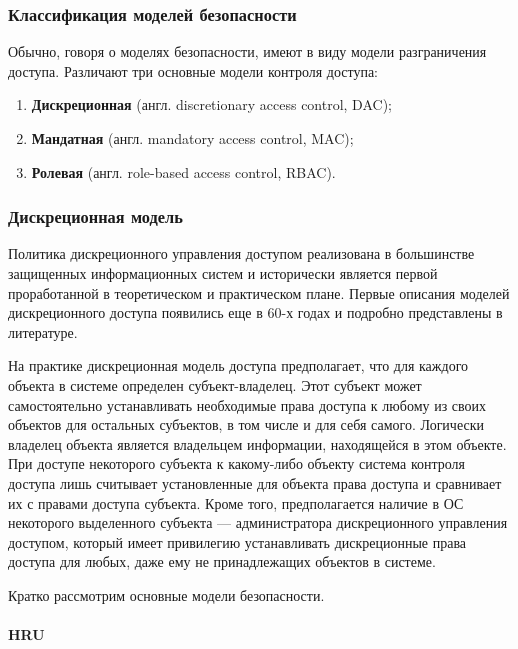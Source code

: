 \subsubsection{Классификация моделей безопасности}

Обычно, говоря о моделях безопасности, имеют в виду модели разграничения доступа. Различают три основные модели контроля доступа:

\begin{enumerate}
    \item\textbf{Дискреционная} (англ. discretionary access control, DAC);
    \item\textbf{Мандатная} (англ. mandatory access control, MAC);
    \item\textbf{Ролевая} (англ. role-based access control, RBAC).
\end{enumerate}

\subsubsection{Дискреционная модель}

Политика дискреционного управления доступом реализована в большинстве защищенных информационных систем и исторически является первой проработанной в теоретическом и практическом плане. Первые описания моделей дискреционного доступа появились еще в 60-х годах и подробно представлены в литературе.

На практике дискреционная модель доступа предполагает, что для каждого объекта в системе определен субъект-владелец. Этот субъект может самостоятельно устанавливать необходимые права доступа к любому из своих объектов для остальных субъектов, в том числе и для себя самого. Логически владелец объекта является владельцем информации, находящейся в этом объекте. При доступе некоторого субъекта к какому-либо объекту система контроля доступа лишь считывает установленные для объекта права доступа и сравнивает их с правами доступа субъекта. Кроме того, предполагается наличие в ОС некоторого выделенного субъекта --- администратора дискреционного управления доступом, который имеет привилегию устанавливать дискреционные права доступа для любых, даже ему не принадлежащих объектов в системе.

Кратко рассмотрим основные модели безопасности.

\paragraph{HRU}

